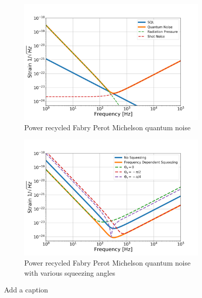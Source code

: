 	\begin{figure}[ht]
		\centering
		\begin{subfigure}[b]{0.7\textwidth}
			\centering
			\includegraphics[width=\textwidth]{../Figures/Kimble_PRFPMI_QM.png}
			\caption{Power recycled Fabry Perot Michelson quantum noise}
			\label{fig:kimble_PRFMI}
		\end{subfigure}
		\hfill
		\begin{subfigure}[b]{0.7\textwidth}
			\centering
			\includegraphics[width=\textwidth]{../Figures/Kimble_PRFPMI_QM_Sqz.png}
			\caption{Power recycled Fabry Perot Michelson quantum noise with various squeezing angles}
			\label{fig:kimble_PRFMI_sqz}
		\end{subfigure}
		\caption{Add a caption}
		\label{fig:PSD_PRFPMI}
	\end{figure}